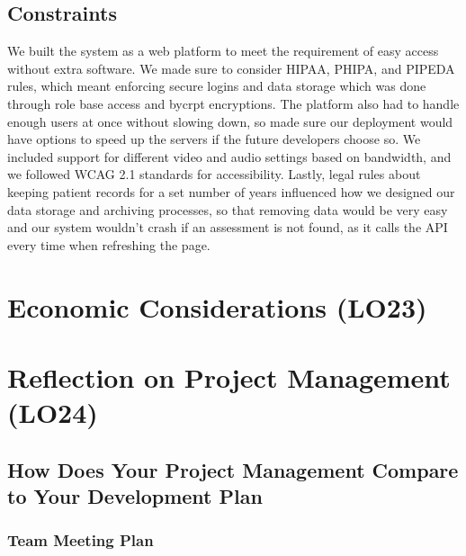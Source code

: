 \documentclass{article}
\begin{document}
\subsection{Constraints}
We built the system as a web platform to meet the requirement of easy access without extra software. We made sure 
to consider HIPAA, PHIPA, and PIPEDA rules, which meant enforcing secure logins and data storage which was done through role base access and bycrpt encryptions. 
The platform also had to handle enough users at once without slowing down, so made sure our deployment would have options to speed up the servers if the 
future developers choose so. We included support for different video and audio settings based on bandwidth, and we followed 
WCAG 2.1 standards for accessibility. Lastly, legal rules about keeping patient records for a set number of years 
influenced how we designed our data storage and archiving processes, so that removing data would be very easy and our system wouldn't crash if an assessment is not found, as it calls the API every time when refreshing the page. 

\newpage

\section{Economic Considerations (LO23)}


\newpage

\section{Reflection on Project Management (LO24)}


\subsection{How Does Your Project Management Compare to Your Development Plan}

\subsubsection{Team Meeting Plan}
\end{document}
